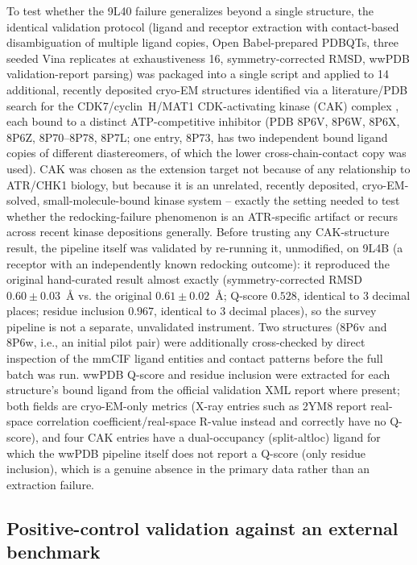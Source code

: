 \documentclass[11pt]{article}
\begin{document}
To test whether the 9L40 failure generalizes beyond a single structure, the
identical validation protocol (ligand and receptor extraction with
contact-based disambiguation of multiple ligand copies, Open
Babel-prepared PDBQTs, three seeded Vina replicates at exhaustiveness 16,
symmetry-corrected RMSD, wwPDB validation-report parsing) was packaged into
a single script and applied to 14 additional, recently deposited cryo-EM
structures identified via a literature/PDB search for the CDK7/cyclin~H/MAT1
CDK-activating kinase (CAK) complex \citep{cushing2024}, each bound to a
distinct ATP-competitive inhibitor (PDB 8P6V, 8P6W, 8P6X, 8P6Z,
8P70--8P78, 8P7L;
one entry, 8P73, has two independent bound ligand copies of different
diastereomers, of which the lower cross-chain-contact copy was used). CAK
was chosen as the extension target not because of any relationship to
ATR/CHK1 biology, but because it is an unrelated, recently deposited,
cryo-EM-solved, small-molecule-bound kinase system -- exactly the setting
needed to test whether the redocking-failure phenomenon is an ATR-specific
artifact or recurs across recent kinase depositions generally. Before
trusting any CAK-structure result, the pipeline itself was validated by
re-running it, unmodified, on 9L4B (a receptor with an independently known
redocking outcome): it reproduced the original hand-curated result almost
exactly (symmetry-corrected RMSD $0.60\pm0.03$~{\AA} vs. the original
$0.61\pm0.02$~{\AA}; Q-score $0.528$, identical to 3 decimal places;
residue inclusion $0.967$, identical to 3 decimal places), so the survey
pipeline is not a separate, unvalidated instrument. Two structures
(8P6v and 8P6w, i.e., an initial pilot pair) were additionally
cross-checked by direct inspection of the mmCIF ligand entities and
contact patterns before the full batch was run. wwPDB Q-score and residue
inclusion were extracted for each structure's bound ligand from the
official validation XML report where present; both fields are cryo-EM-only
metrics (X-ray entries such as 2YM8 report real-space correlation
coefficient/real-space R-value instead and correctly have no Q-score), and
four CAK entries have a dual-occupancy (split-altloc) ligand for which the
wwPDB pipeline itself does not report a Q-score (only residue inclusion),
which is a genuine absence in the primary data rather than an extraction
failure.

\subsection*{Positive-control validation against an external benchmark}
\end{document}

